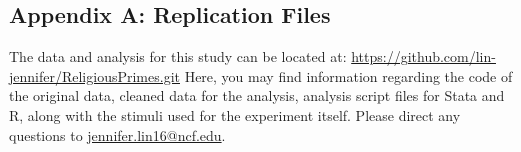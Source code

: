 \documentclass[letterpaper,man,natbib,noextraspace,12pt]{apa6}  %
\begin{document}


\clearpage

\begin{appendices}
\section{Appendix A: Replication Files}

The data and analysis for this study can be located at: \url{https://github.com/lin-jennifer/ReligiousPrimes.git} Here, you may find information regarding the code of the original data, cleaned data for the analysis, analysis script files for Stata and R, along with the stimuli used for the experiment itself. Please direct any questions to \href{mailto:jennifer.lin16@ncf.edu}{jennifer.lin16@ncf.edu}.

\end{appendices}
\end{document}
